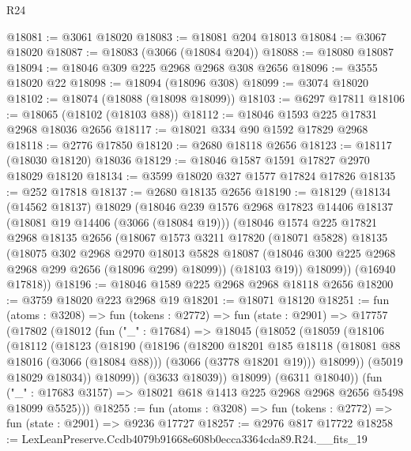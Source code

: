 \begin{lexlean}{R24}
\begin{coremodule}
@18081 := @3061 @18020
@18083 := @18081 @204 @18013
@18084 := @3067 @18020
@18087 := @18083 (@3066 (@18084 @204))
@18088 := @18080 @18087
@18094 := @18046 @309 @225 @2968 @2968 @308 @2656
@18096 := @3555 @18020 @22
@18098 := @18094 (@18096 @308)
@18099 := @3074 @18020
@18102 := @18074 (@18088 (@18098 @18099))
@18103 := @6297 @17811
@18106 := @18065 (@18102 (@18103 @88))
@18112 := @18046 @1593 @225 @17831 @2968 @18036 @2656
@18117 := @18021 @334 @90 @1592 @17829 @2968
@18118 := @2776 @17850
@18120 := @2680 @18118 @2656
@18123 := @18117 (@18030 @18120) @18036
@18129 := @18046 @1587 @1591 @17827 @2970 @18029 @18120
@18134 := @3599 @18020 @327 @1577 @17824 @17826
@18135 := @252 @17818
@18137 := @2680 @18135 @2656
@18190 := @18129
    (@18134
      (@14562 @18137)
      @18029
      (@18046
        @239
        @1576
        @2968
        @17823
        @14406
        @18137
        (@18081 @19 @14406 (@3066 (@18084 @19)))
        (@18046
          @1574
          @225
          @17821
          @2968
          @18135
          @2656
          (@18067
            @1573
            @3211
            @17820
            (@18071 @5828)
            @18135
            (@18075
              @302
              @2968
              @2970
              @18013
              @5828
              @18087
              (@18046 @300 @225 @2968 @2968 @299 @2656 (@18096 @299) @18099))
            (@18103 @19))
          @18099))
      (@16940 @17818))
@18196 := @18046 @1589 @225 @2968 @2968 @18118 @2656
@18200 := @3759 @18020 @223 @2968 @19
@18201 := @18071 @18120
@18251 := fun (atoms : @3208) =>
  fun (tokens : @2772) =>
  fun (state : @2901) =>
  @17757
    (@17802
      (@18012
        (fun ("_" : @17684) =>
        @18045
          (@18052
            (@18059
              (@18106
                (@18112
                  (@18123
                    (@18190
                      (@18196
                        (@18200
                          @18201
                          @185
                          @18118
                          (@18081 @88 @18016 (@3066 (@18084 @88)))
                          (@3066 (@3778 @18201 @19)))
                        @18099))
                    (@5019 @18029 @18034))
                  @18099))
              (@3633 @18039))
            @18099)
          (@6311 @18040))
        (fun ("_" : @17683 @3157) => @18021 @618 @1413 @225 @2968 @2968 @2656 @5498 @18099 @5525)))
@18255 := fun (atoms : @3208) => fun (tokens : @2772) => fun (state : @2901) => @9236 @17727
@18257 := @2976 @817 @17722
@18258 := LexLeanPreserve.Ccdb4079b91668e608b0ecca3364cda89.R24.__fits_19

\end{coremodule}
\end{lexlean}
